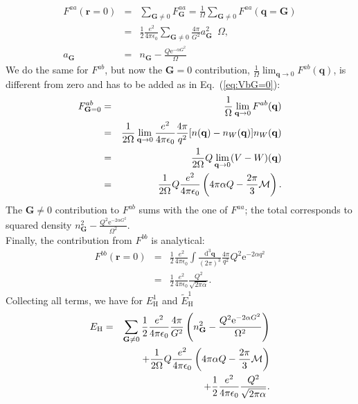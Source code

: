 \documentclass[a4paper,twocolumn,12pt]{article}
\begin{document}
\begin{eqnarray}
F^{aa}(\mathbf{r}=0)&=& \sum_{\mathbf{G}\neq0}F^{aa}_\mathbf{G} =
\frac{1}{\Omega}\sum_{\mathbf{G}\neq0}F^{aa}(\mathbf{q}=\mathbf{G})\nonumber\\
&=&\frac{1}{2}\frac{e^2}{4\pi\epsilon_0}\sum_{\mathbf{G}\neq0}\frac{4\pi}{G^2}a_\mathbf{G}^2\,\,\,\Omega,\\
a_\mathbf{G}&=&n_\mathbf{G}-\frac{Q\mathrm{e}^{-\alpha G^2}}{\Omega}
\end{eqnarray}
%
We do the same for $F^{ab}$, but now the $\mathbf{G}=0$ contribution,
$\frac{1}{\Omega}\lim_{\mathbf{q}\rightarrow0}F^{ab}(\mathbf{q})$, is
different from zero and has to be added as in Eq.~(\ref{eq:VbG=0}):
\begin{eqnarray}
F^{ab}_{\mathbf{G}=0}&=&\frac{1}{\Omega}\lim_{\mathbf{q}\rightarrow0}F^{ab}(\mathbf{q})\nonumber\\
&=& \frac{1}{2\Omega}\lim_{\mathbf{q}\rightarrow0}
\frac{e^2}{4\pi\epsilon_0} \frac{4\pi}{q^2} [n(\mathbf{q})-n_W(\mathbf{q})]n_W(\mathbf{q})\nonumber\\
&=& \frac{1}{2\Omega}Q\lim_{\mathbf{q}\rightarrow0}(V-W)(\mathbf{q})\nonumber\\
&=& \frac{1}{2\Omega}Q\frac{e^2}{4\pi\epsilon_0} \left(4\pi\alpha Q - \frac{2\pi}{3}{\cal{M}}\right).
\end{eqnarray}
The $\mathbf{G}\neq0$ contribution to $F^{ab}$ sums with the one of
$F^{aa}$; the total corresponds to squared density
$n_\mathbf{G}^2-\frac{Q^2\mathrm{e}^{-2\alpha G^2}}{\Omega^2}$.\\
Finally, the contribution from $F^{bb}$ is analytical:
\begin{eqnarray}
F^{bb}(\mathbf{r}=0)&=&\frac{1}{2} \frac{e^2}{4\pi\epsilon_0}
\int\frac{\mathrm{d}^3 \mathbf{q}}{(2\pi)^3} \frac{4\pi}{q^2} Q^2
\mathrm{e}^{-2\alpha q^2} \nonumber\\&=& \frac{1}{2} \frac{e^2}{4\pi\epsilon_0}
\frac{Q^2}{\sqrt{2\pi\alpha}}.
\end{eqnarray}
Collecting all terms, we have for $E_\text{H}^1$ and
$\tilde{E}_\text{H}^1$
\begin{eqnarray}
E_\text{H}&=&
\sum_{\mathbf{G}\neq0}\frac{1}{2}\frac{e^2}{4\pi\epsilon_0}\frac{4\pi}{G^2}
\left(n_\mathbf{G}^2- \frac{Q^2\mathrm{e}^{-2\alpha
G^2}}{\Omega^2}\right)\nonumber\\
&&+\frac{1}{2\Omega}Q\frac{e^2}{4\pi\epsilon_0} \left(4\pi\alpha Q - \frac{2\pi}{3}{\cal{M}}\right) \nonumber\\
&&+ \frac{1}{2} \frac{e^2}{4\pi\epsilon_0}
\frac{Q^2}{\sqrt{2\pi\alpha}}.
\end{eqnarray}
\end{document}
